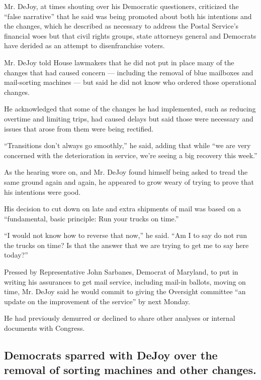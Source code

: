 Mr. DeJoy, at times shouting over his Democratic questioners, criticized
the ``false narrative'' that he said was being promoted about both his
intentions and the changes, which he described as necessary to address
the Postal Service's financial woes but that civil rights groups, state
attorneys general and Democrats have derided as an attempt to
disenfranchise voters.

Mr. DeJoy told House lawmakers that he did not put in place many of the
changes that had caused concern --- including the removal of blue
mailboxes and mail-sorting machines --- but said he did not know who
ordered those operational changes.

He acknowledged that some of the changes he had implemented, such as
reducing overtime and limiting trips, had caused delays but said those
were necessary and issues that arose from them were being rectified.

``Transitions don't always go smoothly,'' he said, adding that while
``we are very concerned with the deterioration in service, we're seeing
a big recovery this week.''

As the hearing wore on, and Mr. DeJoy found himself being asked to tread
the same ground again and again, he appeared to grow weary of trying to
prove that his intentions were good.

His decision to cut down on late and extra shipments of mail was based
on a ``fundamental, basic principle: Run your trucks on time.''

``I would not know how to reverse that now,'' he said. ``Am I to say do
not run the trucks on time? Is that the answer that we are trying to get
me to say here today?''

Pressed by Representative John Sarbanes, Democrat of Maryland, to put in
writing his assurances to get mail service, including mail-in ballots,
moving on time, Mr. DeJoy said he would commit to giving the Oversight
committee ``an update on the improvement of the service'' by next
Monday.

He had previously demurred or declined to share other analyses or
internal documents with Congress.

\hypertarget{democrats-sparred-with-dejoy-over-the-removal-of-sorting-machines-and-other-changes}{%
\subsection{Democrats sparred with DeJoy over the removal of sorting
machines and other
changes.}\label{democrats-sparred-with-dejoy-over-the-removal-of-sorting-machines-and-other-changes}}

